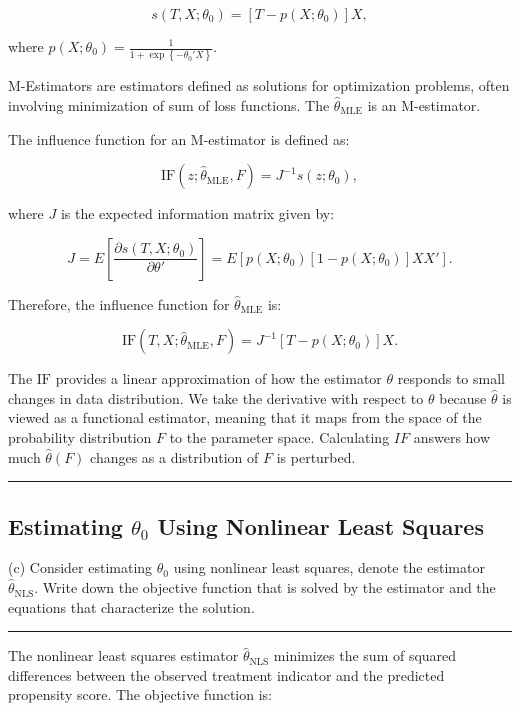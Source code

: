 \documentclass{article}
\newenvironment{colorparagraph}[1]{\par\color{#1}}{\par}
\begin{document}
\[
s(T, X; \theta_0) = [T - p(X; \theta_0)] X,
\]

where \( p(X; \theta_0) = \frac{1}{1 + \exp\left\{ - \theta_0' X \right\}} \).

M-Estimators are estimators defined as solutions for optimization problems, often involving minimization of sum of loss functions. The \( \hat{\theta}_{\text{MLE}} \) is an M-estimator.

The influence function for an M-estimator is defined as:

\[
\text{IF}(z; \hat{\theta}_{\text{MLE}}, F) = J^{-1} s(z; \theta_0),
\]

where \( J \) is the expected information matrix given by:

\[
J = E\left[ \frac{\partial s(T, X; \theta_0)}{\partial \theta'} \right] = E\left[ p(X; \theta_0)[1 - p(X; \theta_0)] X X' \right].
\]

Therefore, the influence function for \( \hat{\theta}_{\text{MLE}} \) is:

\[
\text{IF}(T, X; \hat{\theta}_{\text{MLE}}, F) = J^{-1} [T - p(X; \theta_0)] X.
\]

The $\text{IF}$ provides a linear approximation of how the estimator $\theta$ responds to small changes in data distribution. We take the derivative with respect to $\theta$ because $\hat{\theta}$ is viewed as a functional estimator, meaning that it maps from the space of the probability distribution $F$ to the parameter space. Calculating $IF$ answers how much $\hat{\theta}(F)$ changes as a distribution of $F$ is perturbed.


\begin{colorparagraph}{questioncolor}
\label{q1c}
\rule{\textwidth}{0.5pt}
\subsection{Estimating \( \theta_0 \) Using Nonlinear Least Squares}
(c) Consider estimating \( \theta_0 \) using nonlinear least squares, denote the estimator \( \hat{\theta}_{\text{NLS}} \).
Write down the objective function that is solved by the estimator and the equations that characterize the solution.

\rule{\textwidth}{0.5pt}
\end{colorparagraph}

The nonlinear least squares estimator \( \hat{\theta}_{\text{NLS}} \) minimizes the sum of squared differences between the observed treatment indicator and the predicted propensity score. The objective function is:
\end{document}
